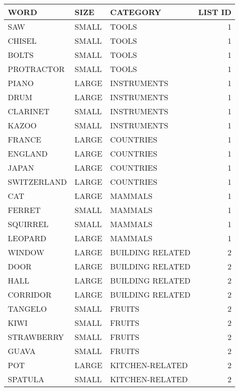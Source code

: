 \begin{tabular}{lllr}
\toprule
        WORD &  SIZE &         CATEGORY &  LIST ID \\
\midrule
         SAW & SMALL &            TOOLS &        1 \\
      CHISEL & SMALL &            TOOLS &        1 \\
       BOLTS & SMALL &            TOOLS &        1 \\
  PROTRACTOR & SMALL &            TOOLS &        1 \\
       PIANO & LARGE &      INSTRUMENTS &        1 \\
        DRUM & LARGE &      INSTRUMENTS &        1 \\
    CLARINET & SMALL &      INSTRUMENTS &        1 \\
       KAZOO & SMALL &      INSTRUMENTS &        1 \\
      FRANCE & LARGE &        COUNTRIES &        1 \\
     ENGLAND & LARGE &        COUNTRIES &        1 \\
       JAPAN & LARGE &        COUNTRIES &        1 \\
 SWITZERLAND & LARGE &        COUNTRIES &        1 \\
         CAT & LARGE &          MAMMALS &        1 \\
      FERRET & SMALL &          MAMMALS &        1 \\
    SQUIRREL & SMALL &          MAMMALS &        1 \\
     LEOPARD & LARGE &          MAMMALS &        1 \\
      WINDOW & LARGE & BUILDING RELATED &        2 \\
        DOOR & LARGE & BUILDING RELATED &        2 \\
        HALL & LARGE & BUILDING RELATED &        2 \\
    CORRIDOR & LARGE & BUILDING RELATED &        2 \\
     TANGELO & SMALL &           FRUITS &        2 \\
        KIWI & SMALL &           FRUITS &        2 \\
  STRAWBERRY & SMALL &           FRUITS &        2 \\
       GUAVA & SMALL &           FRUITS &        2 \\
         POT & LARGE &  KITCHEN-RELATED &        2 \\
     SPATULA & SMALL &  KITCHEN-RELATED &        2 \\

\end{tabular}
